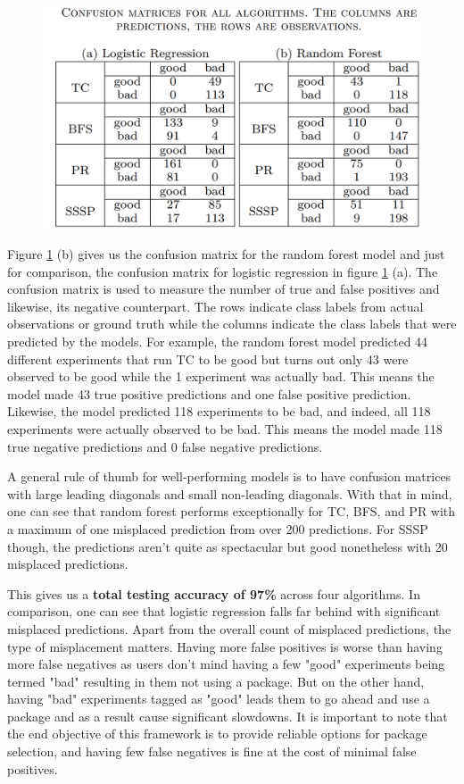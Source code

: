 \begin{figure}
    \centering
    \includegraphics[width=1\columnwidth]{figures/classification_results.png}
    \caption{}
    \label{Confusion matrix}
\end{figure}

Figure \ref{Confusion matrix} (b) gives us the confusion matrix for the random forest model and just for comparison, the confusion matrix for logistic regression in figure \ref{Confusion matrix} (a). The confusion matrix is used to measure the number of true and false positives and likewise, its negative counterpart. The rows indicate class labels from actual observations or ground truth while the columns indicate the class labels that were predicted by the models. For example, the random forest model predicted 44 different experiments that run TC to be good but turns out only 43 were observed to be good while the 1 experiment was actually bad. This means the model made 43 true positive predictions and one false positive prediction. Likewise, the model predicted 118 experiments to be bad, and indeed, all 118 experiments were actually observed to be bad. This means the model made 118 true negative predictions and 0 false negative predictions.

A general rule of thumb for well-performing models is to have confusion matrices with large leading diagonals and small non-leading diagonals. With that in mind, one can see that random forest performs exceptionally for TC, BFS, and PR with a maximum of one misplaced prediction from over 200 predictions. For SSSP though, the predictions aren't quite as spectacular but good nonetheless with 20 misplaced predictions. 

This gives us a \textbf{total testing accuracy of 97\%} across four algorithms. In comparison, one can see that logistic regression falls far behind with significant misplaced predictions. Apart from the overall count of misplaced predictions, the type of misplacement matters. Having more false positives is worse than having more false negatives as users don't mind having a few "good" experiments being termed "bad" resulting in them not using a package. But on the other hand, having "bad" experiments tagged as "good" leads them to go ahead and use a package and as a result cause significant slowdowns. It is important to note that the end objective of this framework is to provide reliable options for package selection, and having few false negatives is fine at the cost of minimal false positives.

